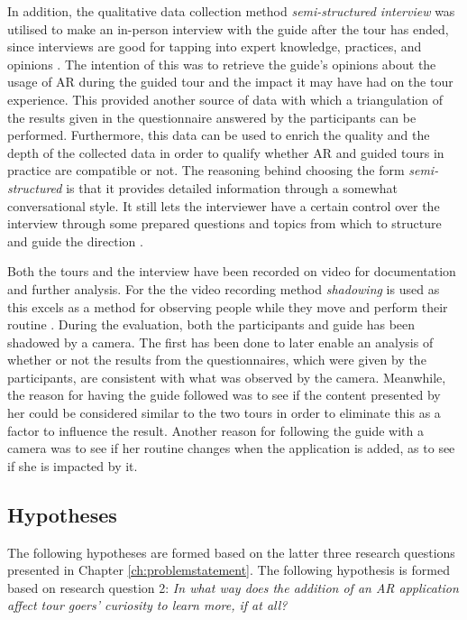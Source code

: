 In addition, the qualitative data collection method \textit{semi-structured interview} was utilised to make an in-person interview with the guide after the tour has ended, since interviews are good for tapping into expert knowledge, practices, and opinions \cite{RAND}. The intention of this was to retrieve the guide’s opinions about the usage of AR during the guided tour and the impact it may have had on the tour experience. This provided another source of data with which a triangulation of the results given in the questionnaire answered by the participants can be performed. Furthermore, this data can be used to enrich the quality and the depth of the collected data in order to qualify whether AR and guided tours in practice are compatible or not. The reasoning behind choosing the form \textit{semi-structured} is that it provides detailed information through a somewhat conversational style. It still lets the interviewer have a certain control over the interview through some prepared questions and topics from which to structure and guide the direction \cite{RAND}.

Both the tours and the interview have been recorded on video for documentation and further analysis. For the the video recording method \textit{shadowing} is used as this excels as a method for observing people while they move and perform their routine \cite{Ylirisku et al.}. During the evaluation, both the participants and guide has been shadowed by a camera. The first has been done to later enable an analysis of whether or not the results from the questionnaires, which were given by the participants, are consistent with what was observed by the camera. Meanwhile, the reason for having the guide followed was to see if the content presented by her could be considered similar to the two tours in order to eliminate this as a factor to influence the result. Another reason for following the guide with a camera was to see if her routine changes when the application is added, as to see if she is impacted by it.

\subsection{Hypotheses}\label{sec:hypotheses}
The following hypotheses are formed based on the latter three research questions presented in Chapter \ref{ch:problemstatement}. The following hypothesis is formed based on research question 2: \textit{In what way does the addition of an AR application affect tour goers’ curiosity to learn more, if at all?}

